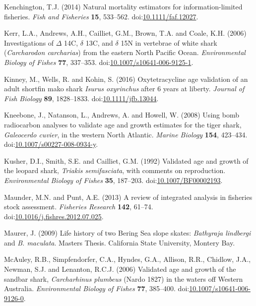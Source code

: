\documentclass[]{article}
\begin{document}
\hypertarget{ref-kenchington_natural_2014}{}
Kenchington, T.J. (2014) Natural mortality estimators for
information-limited fisheries. \emph{Fish and Fisheries} \textbf{15},
533--562.
doi:\href{https://doi.org/10.1111/faf.12027}{10.1111/faf.12027}.

\hypertarget{ref-kerr_investigations_2006}{}
Kerr, L.A., Andrews, A.H., Cailliet, G.M., Brown, T.A. and Coale, K.H.
(2006) Investigations of \(\Delta\) 14C, \(\delta\) 13C, and \(\delta\)
15N in vertebrae of white shark (\emph{Carcharodon carcharias}) from the
eastern North Pacific Ocean. \emph{Environmental Biology of Fishes}
\textbf{77}, 337--353.
doi:\href{https://doi.org/10.1007/s10641-006-9125-1}{10.1007/s10641-006-9125-1}.

\hypertarget{ref-kinney_oxytetracycline_2016}{}
Kinney, M., Wells, R. and Kohin, S. (2016) Oxytetracycline age
validation of an adult shortfin mako shark \emph{Isurus oxyrinchus}
after 6 years at liberty. \emph{Journal of Fish Biology} \textbf{89},
1828--1833.
doi:\href{https://doi.org/10.1111/jfb.13044}{10.1111/jfb.13044}.

\hypertarget{ref-kneebone_using_2008}{}
Kneebone, J., Natanson, L., Andrews, A. and Howell, W. (2008) Using bomb
radiocarbon analyses to validate age and growth estimates for the tiger
shark, \emph{Galeocerdo cuvier}, in the western North Atlantic.
\emph{Marine Biology} \textbf{154}, 423--434.
doi:\href{https://doi.org/10.1007/s00227-008-0934-y}{10.1007/s00227-008-0934-y}.

\hypertarget{ref-kusher_validated_1992}{}
Kusher, D.I., Smith, S.E. and Cailliet, G.M. (1992) Validated age and
growth of the leopard shark, \emph{Triakis semifasciata}, with comments
on reproduction. \emph{Environmental Biology of Fishes} \textbf{35},
187--203.
doi:\href{https://doi.org/10.1007/BF00002193}{10.1007/BF00002193}.

\hypertarget{ref-maunder_review_2013}{}
Maunder, M.N. and Punt, A.E. (2013) A review of integrated analysis in
fisheries stock assessment. \emph{Fisheries Research} \textbf{142},
61--74.
doi:\href{https://doi.org/10.1016/j.fishres.2012.07.025}{10.1016/j.fishres.2012.07.025}.

\hypertarget{ref-maurer_life_2009}{}
Maurer, J. (2009) Life history of two Bering Sea slope skates:
\emph{Bathyraja lindbergi} and \emph{B. maculata}. Masters Thesis.
California State University, Montery Bay.

\hypertarget{ref-mcauley_validated_2006}{}
McAuley, R.B., Simpfendorfer, C.A., Hyndes, G.A., Allison, R.R.,
Chidlow, J.A., Newman, S.J. and Lenanton, R.C.J. (2006) Validated age
and growth of the sandbar shark, \emph{Carcharhinus plumbeus} (Nardo
1827) in the waters off Western Australia. \emph{Environmental Biology
of Fishes} \textbf{77}, 385--400.
doi:\href{https://doi.org/10.1007/s10641-006-9126-0}{10.1007/s10641-006-9126-0}.
\end{document}
